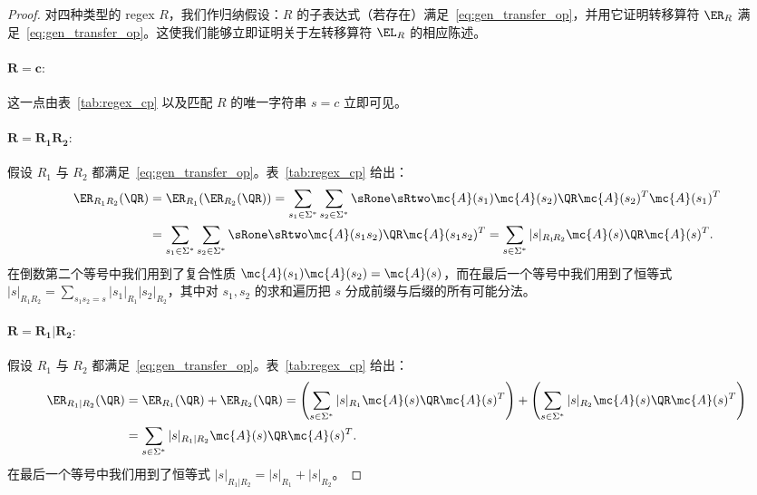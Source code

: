 \begin{proof}

对四种类型的 regex $R$，我们作归纳假设：$R$ 的子表达式（若存在）满足~\eqref{eq:gen_transfer_op}，并用它证明转移算符 $\ER_R$ 满足~\eqref{eq:gen_transfer_op}。这使我们能够立即证明关于左转移算符 $\EL_R$ 的相应陈述。

\paragraph{$\mathbf{R = c:}$} 这一点由表~\ref{tab:regex_cp}
以及匹配 $R$ 的唯一字符串 $s = c$ 立即可见。

\paragraph{$\mathbf{R = R_1 R_2:}$} 假设 $R_1$ 与 $R_2$ 都满足~\eqref{eq:gen_transfer_op}。表~\ref{tab:regex_cp}
给出：
%
\begin{align*}
    \ER_{R_1 R_2}(\QR) &= \ER_{R_1}(\ER_{R_2}(\QR)) = \sum_{s_1 \in \Sigma^*} \sum_{s_2 \in \Sigma^*} \sRone \sRtwo \mc{A}(s_1) \mc{A}(s_2) \QR \mc{A}(s_2)^T \mc{A}(s_1)^T \\
    &= \sum_{s_1 \in \Sigma^*} \sum_{s_2 \in \Sigma^*} \sRone \sRtwo \mc{A}(s_1 s_2) \QR \mc{A}(s_1 s_2)^T = \sum_{s \in \Sigma^*} |s|_{R_1\! R_2} \mc{A}(s) \QR \mc{A}(s)^T.
\end{align*}
%
在倒数第二个等号中我们用到了复合性质 $\mc{A}(s_1)\mc{A}(s_2) = \mc{A}(s)$，而在最后一个等号中我们用到了恒等式 $|s|_{R_1 R_2} = \sum_{s_1 s_2 = s} |s_1|_{R_1} |s_2|_{R_2}$，其中对 $s_1, s_2$ 的求和遍历把 $s$ 分成前缀与后缀的所有可能分法。

\paragraph{$\mathbf{R = R_1 | R_2:}$} 假设 $R_1$ 与 $R_2$ 都满足~\eqref{eq:gen_transfer_op}。表~\ref{tab:regex_cp}
给出：
%
\begin{align*}
    \ER_{R_1 | R_2}(\QR) &= \ER_{R_1}(\QR) + \ER_{R_2}(\QR) = \left(\sum_{s \in \Sigma^*} |s|_{R_1} \mc{A}(s) \QR \mc{A}(s)^T\right) + \left(\sum_{s \in \Sigma^*} |s|_{R_2} \mc{A}(s) \QR \mc{A}(s)^T\right) \\
    &= \sum_{s \in \Sigma^*} |s|_{R_1 | R_2} \mc{A}(s) \QR \mc{A}(s)^T.
\end{align*}
%
在最后一个等号中我们用到了恒等式 $|s|_{R_1 | R_2} = |s|_{R_1} + |s|_{R_2}$。


\end{proof}
